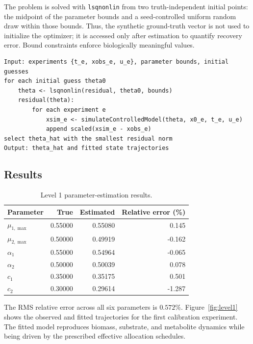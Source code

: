 \documentclass[11pt,a4paper]{article}
\begin{document}
The problem is solved with \texttt{lsqnonlin} from two truth-independent
initial points: the midpoint of the parameter bounds and a seed-controlled
uniform random draw within those bounds. Thus, the synthetic ground-truth
vector is not used to initialize the optimizer; it is accessed only after
estimation to quantify recovery error. Bound constraints enforce biologically
meaningful values.

\noindent\begin{minipage}{\linewidth}
\begin{lstlisting}[style=pseudostyle,title={Compact MATLAB pseudocode}]
Input: experiments {t_e, xobs_e, u_e}, parameter bounds, initial guesses
for each initial guess theta0
    theta <- lsqnonlin(residual, theta0, bounds)
    residual(theta):
        for each experiment e
            xsim_e <- simulateControlledModel(theta, x0_e, t_e, u_e)
            append scaled(xsim_e - xobs_e)
select theta_hat with the smallest residual norm
Output: theta_hat and fitted state trajectories
\end{lstlisting}
\end{minipage}

\subsection{Results}

\begin{table}[H]
\centering
\caption{Level 1 parameter-estimation results.}
\label{tab:level1}
\begin{tabular}{lrrr}
\toprule
Parameter & True & Estimated & Relative error (\%)\\
\midrule
\(\mu_{1,\max}\) & 0.55000 & 0.55080 &  0.145\\
\(\mu_{2,\max}\) & 0.50000 & 0.49919 & -0.162\\
\(\alpha_1\)     & 0.55000 & 0.54964 & -0.065\\
\(\alpha_2\)     & 0.50000 & 0.50039 &  0.078\\
\(c_1\)          & 0.35000 & 0.35175 &  0.501\\
\(c_2\)          & 0.30000 & 0.29614 & -1.287\\
\bottomrule
\end{tabular}
\end{table}

The RMS relative error across all six parameters is \(0.572\%\).
Figure~\ref{fig:level1} shows the observed and fitted trajectories for the
first calibration experiment. The fitted model reproduces biomass, substrate,
and metabolite dynamics while being driven by the prescribed effective
allocation
schedules.
\end{document}
